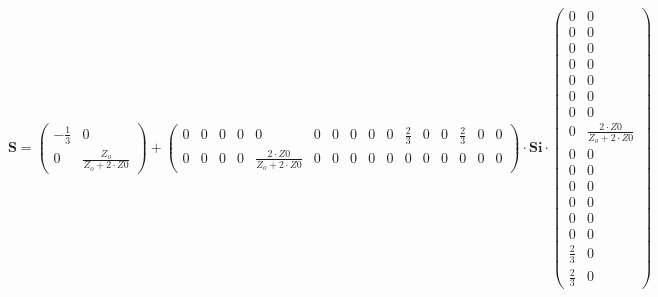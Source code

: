 \[ \mathbf{S} = \left(\begin{smallmatrix} -\frac{1}{3} & 0 \\ 0 & \frac{Z_o}{Z_o+2\cdot Z0} \end{smallmatrix}\right) + \left(\begin{smallmatrix} 0 & 0 & 0 & 0 & 0 & 0 & 0 & 0 & 0 & 0 & \frac{2}{3} & 0 & 0 & \frac{2}{3} & 0 & 0 \\ 0 & 0 & 0 & 0 & \frac{2\cdot Z0}{Z_o+2\cdot Z0} & 0 & 0 & 0 & 0 & 0 & 0 & 0 & 0 & 0 & 0 & 0 \end{smallmatrix}\right) \cdot \mathbf{Si} \cdot\left(\begin{smallmatrix} 0 & 0 \\ 0 & 0 \\ 0 & 0 \\ 0 & 0 \\ 0 & 0 \\ 0 & 0 \\ 0 & 0 \\ 0 & \frac{2\cdot Z0}{Z_o+2\cdot Z0} \\ 0 & 0 \\ 0 & 0 \\ 0 & 0 \\ 0 & 0 \\ 0 & 0 \\ 0 & 0 \\ \frac{2}{3} & 0 \\ \frac{2}{3} & 0 \end{smallmatrix}\right) \]
